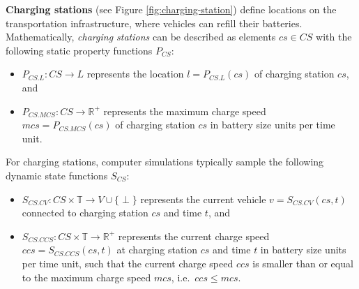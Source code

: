\documentclass[graybox]{svmult}
\begin{document}
\noindent \textbf{Charging stations} (see Figure \ref{fig:charging-station}) define locations on the transportation infrastructure, where vehicles can refill their batteries.
Mathematically, \textit{charging stations} can be described as elements $cs \in CS$ with the following static property functions $P_{CS}$:
\begin{itemize}
	\item $P_{CS.L}: CS \rightarrow L$ represents the location $l = P_{CS.L}(cs)$ of charging station $cs$, and
	\item $P_{CS.MCS}: CS \rightarrow \mathbb{R}^+$ represents the maximum charge speed $mcs = P_{CS.MCS}(cs)$ of charging station $cs$ in battery size units per time unit.
\end{itemize}
For charging stations, computer simulations typically sample the following dynamic state functions $S_{CS}$:
\begin{itemize}
	\item $S_{CS.CV}: CS \times \mathbb{T} \rightarrow V \cup \{\perp\}$ represents the current vehicle $v = S_{CS.CV}(cs, t)$ connected to charging station $cs$ and time $t$, and
	\item $S_{CS.CCS}: CS \times \mathbb{T} \rightarrow \mathbb{R}^+$ represents the current charge speed $ccs = S_{CS.CCS}(cs, t)$ at charging station $cs$ and time $t$ in battery size units per time unit, such that the current charge speed $ccs$ is smaller than or equal to the maximum charge speed $mcs$, i.e.\ $ccs \leq mcs$.
\end{itemize}
\end{document}
